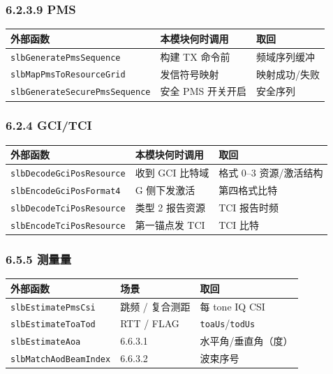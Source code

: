\documentclass[11pt,a4paper]{ctexart}
\begin{document}
\subsubsection{6.2.3.9 PMS}

\begin{table}[h]
\centering
\small
\begin{tabular}{L{4.6cm}L{4.0cm}L{4.6cm}}
\toprule
\textbf{外部函数} & \textbf{本模块何时调用} & \textbf{取回} \\
\midrule
\texttt{slbGeneratePmsSequence} & 构建 TX 命令前 & 频域序列缓冲 \\
\texttt{slbMapPmsToResourceGrid} & 发信符号映射 & 映射成功/失败 \\
\texttt{slbGenerateSecurePmsSequence} & 安全 PMS 开关开启 & 安全序列 \\
\bottomrule
\end{tabular}
\end{table}

\subsubsection{6.2.4 GCI/TCI}

\begin{table}[h]
\centering
\small
\begin{tabular}{L{4.6cm}L{4.0cm}L{4.6cm}}
\toprule
\textbf{外部函数} & \textbf{本模块何时调用} & \textbf{取回} \\
\midrule
\texttt{slbDecodeGciPosResource} & 收到 GCI 比特域 & 格式 0--3 资源/激活结构 \\
\texttt{slbEncodeGciPosFormat4} & G 侧下发激活 & 第四格式比特 \\
\texttt{slbDecodeTciPosResource} & 类型 2 报告资源 & TCI 报告时频 \\
\texttt{slbEncodeTciPosResource} & 第一锚点发 TCI & TCI 比特 \\
\bottomrule
\end{tabular}
\end{table}

\subsubsection{6.5.5 测量量}

\begin{table}[h]
\centering
\small
\begin{tabular}{L{4.8cm}L{3.8cm}L{4.6cm}}
\toprule
\textbf{外部函数} & \textbf{场景} & \textbf{取回} \\
\midrule
\texttt{slbEstimatePmsCsi} & 跳频 / 复合测距 & 每 tone IQ CSI \\
\texttt{slbEstimateToaTod} & RTT / FLAG & \texttt{toaUs}/\texttt{todUs} \\
\texttt{slbEstimateAoa} & 6.6.3.1 & 水平角/垂直角（度） \\
\texttt{slbMatchAodBeamIndex} & 6.6.3.2 & 波束序号 \\
\bottomrule
\end{tabular}
\end{table}
\end{document}
